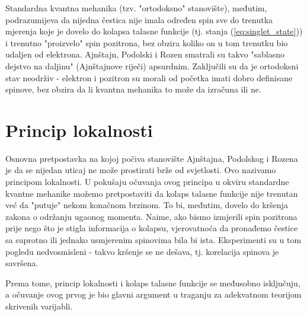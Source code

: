 Standardna kvantna mehanika (tzv. "ortodoksno" stanovište), međutim,  podrazumijeva da nijedna čestica nije imala određen spin sve do trenutka mjerenja koje je dovelo do kolapsa talasne funkcije (tj. stanja (\ref{eq:singlet_state})) i trenutno "proizvelo" spin pozitrona, bez obzira koliko on u tom trenutku bio udaljen od elektrona.
Ajnštajn, Podolski i Rozen smatrali su takvo "sablasno dejstvo na daljinu" (Ajnštajnove riječi) apsurdnim. Zaključili su da je ortodoksni stav neodrživ - elektron i pozitron su morali od početka imati dobro definisane spinove, bez obzira da li kvantna mehanika to može da izračuna ili ne.

\section{Princip lokalnosti}

Osnovna pretpostavka na kojoj počiva stanovište Ajnštajna, Podolskog i Rozena je da se nijedan uticaj ne može prostirati brže od svjetlosti. Ovo nazivamo principom lokalnosti. U pokušaju očuvanja ovog principa u okviru standardne kvantne mehanike možemo pretpostaviti da kolaps talasne funkcije nije trenutan već da "putuje" nekom konačnom brzinom. To bi, međutim, dovelo do kršenja zakona o održanju ugaonog momenta.
Naime, ako bismo izmjerili spin pozitrona prije nego što je stigla informacija o kolapsu, vjerovatnoća da pronađemo čestice sa suprotno ili jednako usmjerenim spinovima bila bi ista. Eksperimenti su u tom pogledu nedvosmisleni - takvo kršenje se ne dešava, tj. korelacija spinova je savršena.

Prema tome, princip lokalnosti i kolaps talasne funkcije se međusobno isključuju, a očuvanje ovog prvog je bio glavni argument u traganju za adekvatnom teorijom skrivenih varijabli.